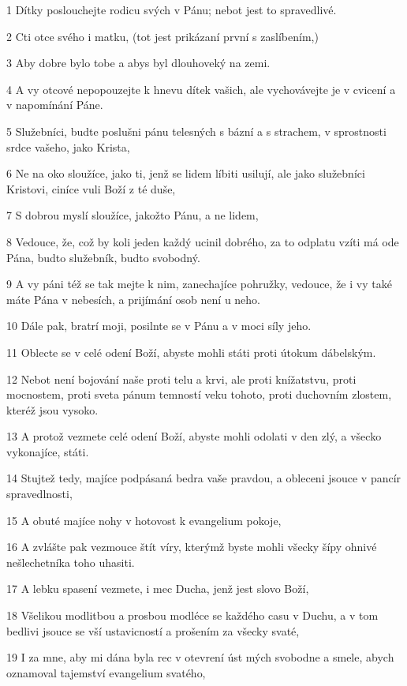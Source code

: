 \par 1 Dítky poslouchejte rodicu svých v Pánu; nebot jest to spravedlivé.
\par 2 Cti otce svého i matku, (tot jest prikázaní první s zaslíbením,)
\par 3 Aby dobre bylo tobe a abys byl dlouhoveký na zemi.
\par 4 A vy otcové nepopouzejte k hnevu dítek vašich, ale vychovávejte je v cvicení a v napomínání Páne.
\par 5 Služebníci, budte poslušni pánu telesných s bázní a s strachem, v sprostnosti srdce vašeho, jako Krista,
\par 6 Ne na oko sloužíce, jako ti, jenž se lidem líbiti usilují, ale jako služebníci Kristovi, ciníce vuli Boží z té duše,
\par 7 S dobrou myslí sloužíce, jakožto Pánu, a ne lidem,
\par 8 Vedouce, že, což by koli jeden každý ucinil dobrého, za to odplatu vzíti má ode Pána, budto služebník, budto svobodný.
\par 9 A vy páni též se tak mejte k nim, zanechajíce pohružky, vedouce, že i vy také máte Pána v nebesích, a prijímání osob není u neho.
\par 10 Dále pak, bratrí moji, posilnte se v Pánu a v moci síly jeho.
\par 11 Oblecte se v celé odení Boží, abyste mohli státi proti útokum dábelským.
\par 12 Nebot není bojování naše proti telu a krvi, ale proti knížatstvu, proti mocnostem, proti sveta pánum temností veku tohoto, proti duchovním zlostem, kteréž jsou vysoko.
\par 13 A protož vezmete celé odení Boží, abyste mohli odolati v den zlý, a všecko vykonajíce, státi.
\par 14 Stujtež tedy, majíce podpásaná bedra vaše pravdou, a obleceni jsouce v pancír spravedlnosti,
\par 15 A obuté majíce nohy v hotovost k evangelium pokoje,
\par 16 A zvlášte pak vezmouce štít víry, kterýmž byste mohli všecky šípy ohnivé nešlechetníka toho uhasiti.
\par 17 A lebku spasení vezmete, i mec Ducha, jenž jest slovo Boží,
\par 18 Všelikou modlitbou a prosbou modléce se každého casu v Duchu, a v tom bedlivi jsouce se vší ustavicností a prošením za všecky svaté,
\par 19 I za mne, aby mi dána byla rec v otevrení úst mých svobodne a smele, abych oznamoval tajemství evangelium svatého,

